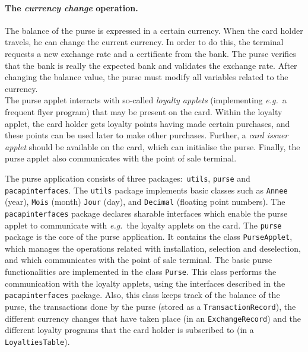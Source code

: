 \documentclass[a4paper]{llncs}
\begin{document}
\paragraph{\bf The \textit{currency change} operation.} The balance
of the purse is expressed in a certain currency. When the card holder
travels, he can change the current currency. In order to do this, the
terminal requests a new exchange rate and a certificate from the
bank. The purse verifies that the bank is really the expected bank and
validates the exchange rate. After changing the balance value, the
purse must modify all variables related to the currency. \\

The purse applet interacts with so-called \textit{loyalty applets}
(implementing \emph{e.g.}~a frequent flyer program) that may be
present on the card. Within the loyalty applet, the card holder gets
loyalty points having made certain purchases, and these points can be
used later to make other purchases. Further, a \textit{card issuer
applet} should be available on the card, which can initialise the
purse. Finally, the purse applet also communicates with the 
point of sale terminal. 

The purse application consists of three packages$:$ \texttt{utils},
\texttt{purse} and \texttt{pacap\-interfaces}. The {\tt utils} package
implements basic classes such as \texttt{Annee} (year), 
\texttt{Mois} (month) \texttt{Jour} (day), and \texttt{Decimal}
(floating point numbers).  The \texttt{pacap\-interfaces} package
declares sharable interfaces which enable the purse applet to
communicate with \emph{e.g.}~the loyalty applets on the card.  The
\texttt{purse} package is the core of the purse application.  It
contains the class
\texttt{PurseApplet}, which manages the operations related with 
installation, selection and deselection, and which communicates with the
point of sale terminal.  The basic purse functionalities are
implemented in the class
\texttt{Purse}. This class performs the communication
with the loyalty applets, using the interfaces described in the
\texttt{pacapinterfaces} package.  Also, this class keeps track of the 
balance of the purse, the transactions done by the purse (stored as a
\texttt{TransactionRecord}), the different currency changes that have
taken place (in an \texttt{ExchangeRecord}) and the different
loyalty programs that the card holder is subscribed to (in a
\texttt{LoyaltiesTable}). 
\end{document}
